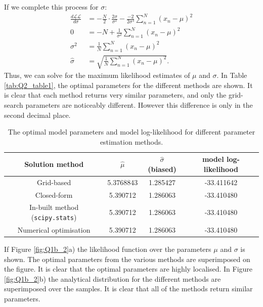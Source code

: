 \documentclass{article}
\begin{document}
If we complete this process for $\sigma$:
\begin{equation}
\begin{aligned}
\frac{d\mathcal{LL}}{d\sigma} &= -\frac{N}{2}\cdot\frac{2\sigma}{\sigma^2} -\frac{-2}{2\sigma^3} \sum_{n=1}^{N} \left(x_n - \mu\right)^2 \\
0 &=  -N + \frac{1}{\sigma^2} \sum_{n=1}^{N} \left(x_n - \mu\right)^2 \\
\sigma^2 &= \frac{1}{N} \sum_{n=1}^{N} \left(x_n - \mu\right)^2 \\
\hat{\sigma} &= \sqrt{\frac{1}{N} \sum_{n=1}^{N} \left(x_n - \mu\right)^2}.
\end{aligned}
\end{equation}
Thus, we can solve for the maximum likelihood estimates of $\mu$ and $\sigma$. In Table \ref{tab:Q2_table1}, the optimal parameters for the different methods are shown. It is clear that each method returns very similar parameters, and only the grid-search parameters are noticeably different. However this difference is only in the second decimal place.
\begin{table}[!htb]
\centering
\caption{The optimal model parameters and model log-likelihood for different parameter estimation methods.}
\label{tab:Q1b_table}
\begin{tabular}{@{}cccc@{}}
\toprule
Solution method & $\hat{\mu}$ & $\hat{\sigma}$ (biased) & model log-likelihood \\ \midrule
Grid-based & 5.3768843 & 1.285427 & -33.411642 \\
Closed-form & 5.390712 & 1.286063 & -33.410480 \\
In-built method (\texttt{scipy.stats}) & 5.390712 & 1.286063 & -33.410480 \\
Numerical optimisation & 5.390712 & 1.286063 & -33.410480 \\ \bottomrule
\end{tabular}
\end{table}

If Figure \ref{fig:Q1b_2}a) the likelihood function over the parameters $\mu$ and $\sigma$ is shown. The optimal parameters from the various methods are superimposed on the figure. It is clear that the optimal parameters are highly localised. In Figure \ref{fig:Q1b_2}b) the analytical distribution for the different methods are superimposed over the samples. It is clear that all of the methods return similar parameters. 
\end{document}
